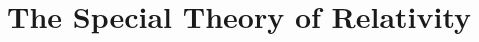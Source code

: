 

\setcounter{section}{14}


  \section{The Special Theory of Relativity}
  
  
  
  
  
  
  
  
  

